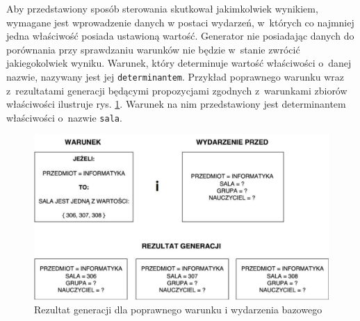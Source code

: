 \documentclass[a4paper]{book}
\begin{document}
Aby przedstawiony sposób sterowania skutkował jakimkolwiek wynikiem, wymagane jest wprowadzenie danych w postaci wydarzeń, w~których co najmniej jedna właściwość posiada ustawioną wartość. Generator nie posiadając danych do porównania przy sprawdzaniu warunków nie będzie w~stanie zwrócić jakiegokolwiek wyniku. Warunek, który determinuje wartość właściwości o~danej nazwie, nazywany jest jej \lstinline|determinantem|. Przykład poprawnego warunku wraz z~rezultatami generacji będącymi propozycjami zgodnych z~warunkami zbiorów właściwości ilustruje rys. \ref{id:fig:RezultatGeneracji}. Warunek na nim przedstawiony jest determinantem właściwości o~nazwie \lstinline|sala|.
\begin{figure}
	\centering
	\includegraphics[width=1.0\textwidth]{./img/RezultatGeneracjiLiteraI.pdf}
	\caption{Rezultat generacji dla poprawnego warunku i wydarzenia bazowego}
	\label{id:fig:RezultatGeneracji}
\end{figure}
\end{document}
